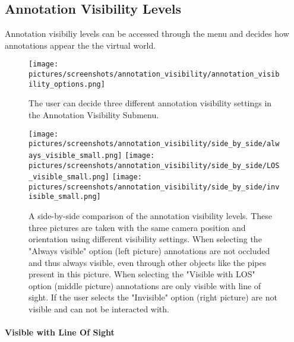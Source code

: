 
\subsection{Annotation Visibility Levels}
\label{sec:annotations}
Annotation visibiliy levels can be accessed through the menu and decides how annotations appear the the virtual world. 


\begin{figure}%
	\texttt{[image: pictures/screenshots/annotation\_visibility/annotation\_visibility\_options.png]}
	\caption[The Annotation Visibility Submenu]{The user can decide three different annotation visibility settings in the Annotation Visibility Submenu.}
	\label{fig:annotation_visibility_options}
\end{figure} 

\begin{figure}%
	\texttt{[image: pictures/screenshots/annotation\_visibility/side\_by\_side/always\_visible\_small.png]}
	\texttt{[image: pictures/screenshots/annotation\_visibility/side\_by\_side/LOS\_visible\_small.png]}
	\texttt{[image: pictures/screenshots/annotation\_visibility/side\_by\_side/invisible\_small.png]}
	\caption[Annotation visibility levels comparison]{A side-by-side comparison of the annotation visibility levels. These three pictures are taken with the same camera position
	and orientation using different visibility settings. When selecting the "Always visible" option (left picture) annotations are not occluded and thus always visible, even through other objects like
	the pipes present in this picture. When selecting the "Visible with LOS" option (middle picture) annotations are only visible with line of sight. 
	If the user selects the "Invisible" option (right picture) are not visible and can not be interacted with.}
	\label{fig:visibility_comparison}
\end{figure} 



\paragraph{Visible with Line Of Sight}


